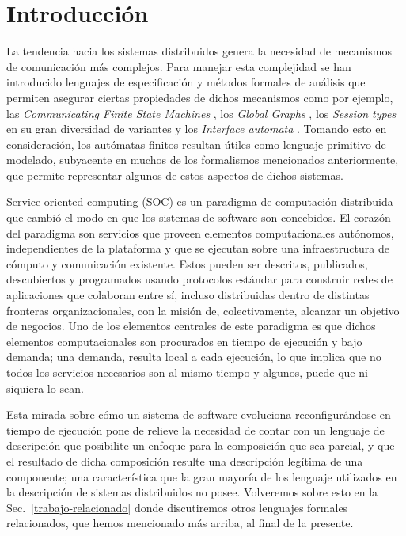 \chapter{Introducción}
La tendencia hacia los sistemas distribuidos genera la necesidad de mecanismos de comunicación más complejos. Para manejar esta complejidad se han introducido lenguajes de especificación y métodos formales de análisis que permiten asegurar ciertas propiedades de dichos mecanismos como por ejemplo, las \emph{Communicating Finite State Machines} \cite{brand:jacm-30_2}, los \emph{Global Graphs} \cite{castagna:lmcs-8_1}, los \emph{Session types} en su gran diversidad de variantes \cite{honda:esop98,honda:popl08} y los \emph{Interface automata} \cite{dealfaro:esec-fse-01}. Tomando esto en consideración, los autómatas finitos resultan útiles como lenguaje primitivo de modelado, subyacente en muchos de los formalismos mencionados anteriormente, que permite representar algunos de estos aspectos de dichos sistemas.

Service oriented computing (SOC) es un paradigma de computación distribuida que cambió el modo en que los sistemas de software son concebidos. El corazón del paradigma son servicios que proveen elementos computacionales autónomos, independientes de la plataforma y que se ejecutan sobre una infraestructura de cómputo y comunicación existente. Estos pueden ser descritos, publicados, descubiertos y programados usando protocolos estándar para construir redes de aplicaciones que colaboran entre sí, incluso distribuidas dentro de distintas fronteras organizacionales, con la misión de, colectivamente, alcanzar un objetivo de negocios. Uno de los elementos centrales de este paradigma es que dichos elementos computacionales son procurados en tiempo de ejecución y bajo demanda; una demanda, resulta local a cada ejecución, lo que implica que no todos los servicios necesarios son al mismo tiempo y algunos, puede que ni siquiera lo sean.

Esta mirada sobre cómo un sistema de software evoluciona reconfigurándose en tiempo de ejecución pone de relieve la necesidad de contar con un lenguaje de descripción que posibilite un enfoque para la composición que sea parcial, y que el resultado de dicha composición resulte una descripción legítima de una componente; una característica que la gran mayoría de los lenguaje utilizados en la descripción de sistemas distribuidos no posee. Volveremos sobre esto en la Sec.~\ref{trabajo-relacionado} donde discutiremos otros lenguajes formales relacionados, que hemos mencionado más arriba, al final de la presente.\\

